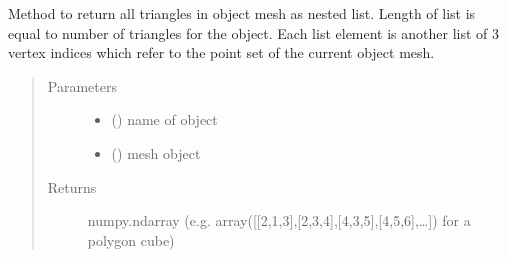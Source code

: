 \documentclass[letterpaper,10pt,english]{sphinxmanual}
\begin{document}
\begin{fulllineitems}
\label{\detokenize{pk_src.misc:pk_src.misc.getTriangles}}
Method to return all triangles in object mesh as nested list. Length of list is equal to number of triangles for the object. Each list element is another list of 3 vertex indices which refer to the point set of the current object mesh.
\begin{quote}\begin{description}
\item[{Parameters}] \leavevmode\begin{itemize}
\item {} 
 () \textendash{} name of object

\item {} 
 () \textendash{} mesh object

\end{itemize}

\item[{Returns}] \leavevmode
numpy.ndarray (e.g. array({[}{[}2,1,3{]},{[}2,3,4{]},{[}4,3,5{]},{[}4,5,6{]},…{]}) for a polygon cube)


\end{description}
\end{quote}
\end{fulllineitems}
\end{document}
